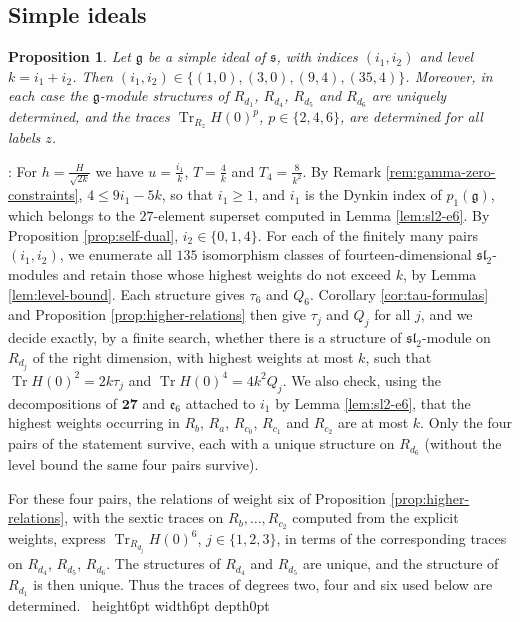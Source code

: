 \documentclass[leqno]{article}
\renewcommand{\leq}{\ensuremath{\leqslant}}
\renewcommand{\geq}{\ensuremath{\geqslant}}
\newcommand{\qed}{\hfill \vrule height6pt  width6pt depth0pt}
\newtheorem{prop}[thm]{Proposition}
\newenvironment{proof}[1][]{\noindent {\it Proof #1} : }{\hbox{~}\qed
\smallskip
}
\numberwithin{equation}{section}
\begin{document}
\subsection{Simple ideals}

\begin{prop}
\label{prop:simple-ideals-gamma0}
Let $\mathfrak g$ be a simple ideal of $\mathfrak s$, with indices $(i_1,i_2)$ and level $k = i_1+i_2$. Then $(i_1,i_2) \in \{(1,0),(3,0),(9,4),(35,4)\}$. Moreover, in each case the $\mathfrak g$-module structures of $R_{d_1}$, $R_{d_4}$, $R_{d_5}$ and $R_{d_6}$ are uniquely determined, and the traces $\operatorname{Tr}_{R_z}H(0)^p$, $p \in \{2,4,6\}$, are determined for all labels $z$.
\end{prop}

\begin{proof}
For $h = \frac{H}{\sqrt{2k}}$ we have $u = \frac{i_1}{k}$, $T = \frac{4}{k}$ and $T_4 = \frac{8}{k^2}$. By Remark \ref{rem:gamma-zero-constraints}, $4 \leq 9i_1-5k$, so that $i_1 \geq 1$, and $i_1$ is the Dynkin index of $p_1(\mathfrak g)$, which belongs to the $27$-element superset computed in Lemma \ref{lem:sl2-e6}. By Proposition \ref{prop:self-dual}, $i_2 \in \{0,1,4\}$. For each of the finitely many pairs $(i_1,i_2)$, we enumerate all $135$ isomorphism classes of fourteen-dimensional $\mathfrak{sl}_2$-modules and retain those whose highest weights do not exceed $k$, by Lemma \ref{lem:level-bound}. Each structure gives $\tau_6$ and $Q_6$. Corollary \ref{cor:tau-formulas} and Proposition \ref{prop:higher-relations} then give $\tau_j$ and $Q_j$ for all $j$, and we decide exactly, by a finite search, whether there is a structure of $\mathfrak{sl}_2$-module on $R_{d_j}$ of the right dimension, with highest weights at most $k$, such that $\operatorname{Tr}H(0)^2 = 2k\tau_j$ and $\operatorname{Tr}H(0)^4 = 4k^2Q_j$. We also check, using the decompositions of $\mathbf{27}$ and $\mathfrak e_6$ attached to $i_1$ by Lemma \ref{lem:sl2-e6}, that the highest weights occurring in $R_b$, $R_a$, $R_{c_0}$, $R_{c_1}$ and $R_{c_2}$ are at most $k$. Only the four pairs of the statement survive, each with a unique structure on $R_{d_6}$ (without the level bound the same four pairs survive).

For these four pairs, the relations of weight six of Proposition \ref{prop:higher-relations}, with the sextic traces on $R_b,\ldots,R_{c_2}$ computed from the explicit weights, express $\operatorname{Tr}_{R_{d_j}}H(0)^6$, $j \in \{1,2,3\}$, in terms of the corresponding traces on $R_{d_4}$, $R_{d_5}$, $R_{d_6}$. The structures of $R_{d_4}$ and $R_{d_5}$ are unique, and the structure of $R_{d_1}$ is then unique. Thus the traces of degrees two, four and six used below are determined.
\end{proof}
\end{document}
